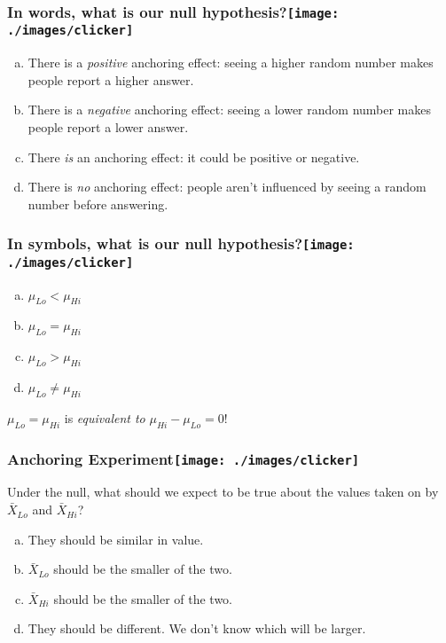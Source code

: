 \begin{frame}
	\frametitle{In words, what is our null hypothesis?\hfill \texttt{[image: ./images/clicker]}}

	\begin{enumerate}[(a)]
		\item There is a \emph{positive} anchoring effect: seeing a higher random number makes people report a higher answer.
		\item There is a \emph{negative} anchoring effect: seeing a lower random number makes people report a lower answer. 
		\item There \emph{is} an anchoring effect: it could be positive or negative.
		\item There is  \emph{no} anchoring effect: people aren't influenced by seeing a random number before answering.
	\end{enumerate}
\end{frame}
\begin{frame}
	\frametitle{In symbols, what is our null hypothesis?\hfill \texttt{[image: ./images/clicker]}}

	\begin{enumerate}[(a)]
		\item $\mu_{Lo} < \mu_{Hi}$
		\item $\mu_{Lo} = \mu_{Hi}$
		\item $\mu_{Lo} > \mu_{Hi}$
		\item $\mu_{Lo} \neq \mu_{Hi}$
	\end{enumerate}
\pause
	\vspace{1em}

	\alert{$\mu_{Lo} = \mu_{Hi}$ is \emph{equivalent to} $\mu_{Hi} - \mu_{Lo} = 0$!}
\end{frame}
\begin{frame}
	\frametitle{Anchoring Experiment\hfill \texttt{[image: ./images/clicker]}}
 
Under the null, what should we expect to be true about the values taken on by $\bar{X}_{Lo}$ and $\bar{X}_{Hi}$?

\vspace{1em}

	\begin{enumerate}[(a)]
		\item They should be similar in value.
		\item $\bar{X}_{Lo}$ should be the smaller of the two.
		\item $\bar{X}_{Hi}$ should be the smaller of the two.
		\item They should be different. We don't know which will be larger.
	\end{enumerate}
\end{frame}

